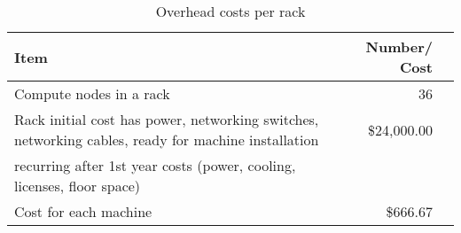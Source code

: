 \tiny \begin{longtable} { |p{}  |r  |r |} 
\caption{Overhead costs per rack \label{tab:overheads}}\\ 
\hline 
{Item}&{Number/ Cost} \\ \hline
{Compute nodes in a rack }&{36} \\ \hline
{Rack initial cost has power, networking switches, networking cables, ready for machine installation }&{\$24,000.00} \\ \hline
{recurring after 1st year costs (power, cooling, licenses, floor space) }& \\ \hline
{Cost for each machine }&{\$666.67} \\ \hline
\end{longtable} \normalsize
